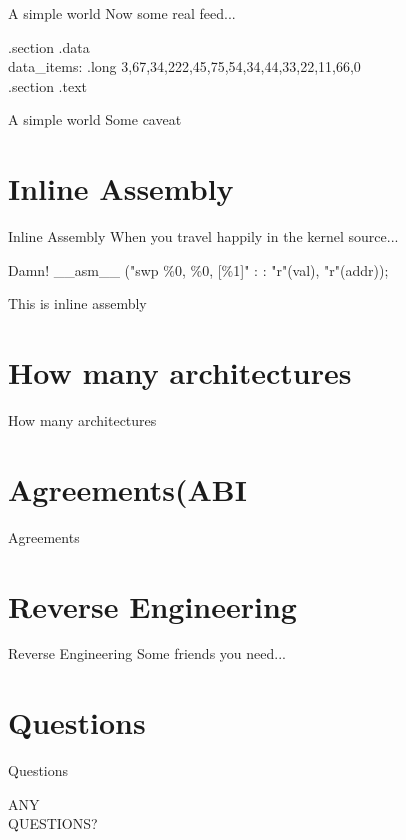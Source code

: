 \documentclass[UKenglish]{beamer}
\begin{document}
  \begin{frame}{A simple world}
  Now some real feed...
    \begin{example}
      .section .data\\
    data\_items:
    .long 3,67,34,222,45,75,54,34,44,33,22,11,66,0\\
    .section .text
    \end{example}
  \end{frame}

    \begin{frame}{A simple world}
      Some caveat
  \end{frame}

\section{Inline Assembly}
\begin{frame}{Inline Assembly}
  When you travel happily in the kernel source...
  \begin{alertblock}{Damn!}
    \_\_asm\_\_ ("swp \%0, \%0, [\%1]" : : "r"(val), "r"(addr));
  \end{alertblock}
  This is inline assembly
  
\end{frame}

\section{How many architectures}
\begin{frame}{How many architectures}
  
\end{frame}

\section{Agreements(ABI}
\begin{frame}{Agreements}
  
\end{frame}

\section{Reverse Engineering}
\begin{frame}{Reverse Engineering}
Some friends you need...  
\end{frame}

\section{Questions}
\begin{frame}{Questions}
  \begin{center}
    \vspace{1.5cm}
    \Huge ANY\\
    \Huge QUESTIONS?\\
  \end{center}
\end{frame}
\end{document}

